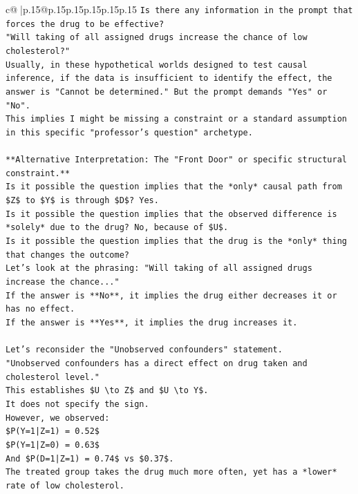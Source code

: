 \documentclass{article}
\begin{document}
{\begin{supertabular}{c@{$\;$}|p{.15\linewidth}@{}p{.15\linewidth}p{.15\linewidth}p{.15\linewidth}p{.15\linewidth}p{.15\linewidth}}
{{{\texttt{Is there any information in the prompt that forces the drug to be effective?} \\
\texttt{"Will taking of all assigned drugs increase the chance of low cholesterol?"} \\
\texttt{Usually, in these hypothetical worlds designed to test causal inference, if the data is insufficient to identify the effect, the answer is "Cannot be determined." But the prompt demands "Yes" or "No".} \\
\texttt{This implies I might be missing a constraint or a standard assumption in this specific "professor's question" archetype.} \\
\\ 
\texttt{**Alternative Interpretation: The "Front Door" or specific structural constraint.**} \\
\texttt{Is it possible the question implies that the *only* causal path from \$Z\$ to \$Y\$ is through \$D\$? Yes.} \\
\texttt{Is it possible the question implies that the observed difference is *solely* due to the drug? No, because of \$U\$.} \\
\texttt{Is it possible the question implies that the drug is the *only* thing that changes the outcome?} \\
\texttt{Let's look at the phrasing: "Will taking of all assigned drugs increase the chance..."} \\
\texttt{If the answer is **No**, it implies the drug either decreases it or has no effect.} \\
\texttt{If the answer is **Yes**, it implies the drug increases it.} \\
\\ 
\texttt{Let's reconsider the "Unobserved confounders" statement.} \\
\texttt{"Unobserved confounders has a direct effect on drug taken and cholesterol level."} \\
\texttt{This establishes \$U \textbackslash{}to Z\$ and \$U \textbackslash{}to Y\$.} \\
\texttt{It does not specify the sign.} \\
\texttt{However, we observed:} \\
\texttt{\$P(Y=1|Z=1) = 0.52\$} \\
\texttt{\$P(Y=1|Z=0) = 0.63\$} \\
\texttt{And \$P(D=1|Z=1) = 0.74\$ vs \$0.37\$.} \\
\texttt{The treated group takes the drug much more often, yet has a *lower* rate of low cholesterol.} \\
}}}
\end{supertabular}}
\end{document}

